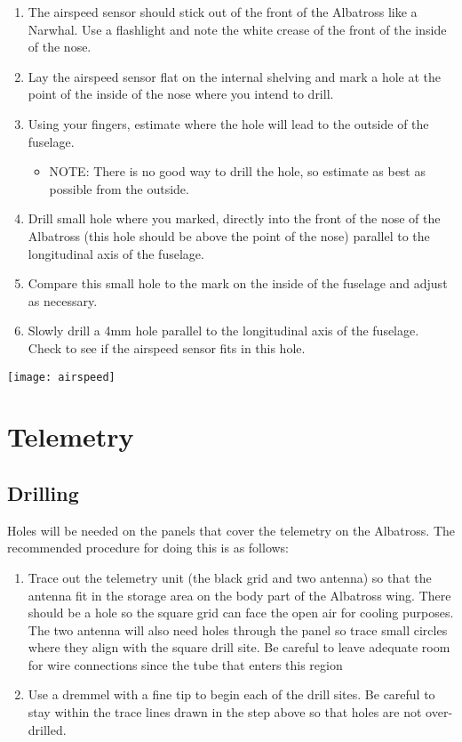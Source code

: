 \documentclass{article}
\begin{document}
\begin{enumerate}
\item The airspeed sensor should stick out of the front of the Albatross like a Narwhal. Use a flashlight and note the white crease of the front of the inside of the nose.
\item Lay the airspeed sensor flat on the internal shelving and mark a hole at the point of the inside of the nose where you intend to drill.
\item Using your fingers, estimate where the hole will lead to the outside of the fuselage. 
   \begin{itemize}
   \item NOTE: There is no good way to drill the hole, so estimate as best as possible from the outside.
   \end{itemize}
\item Drill small hole where you marked, directly into the front of the nose of the Albatross (this hole should be above the point of the nose) parallel to the longitudinal axis of the fuselage. 
\item Compare this small hole to the mark on the inside of the fuselage and adjust as necessary. 
\item Slowly drill a 4mm hole parallel to the longitudinal axis of the fuselage. Check to see if the airspeed sensor fits in this hole. 
\end{enumerate}

\begin{center}
\texttt{[image: airspeed]}
\end{center}

\clearpage


\section{Telemetry}

\subsection{Drilling}
Holes will be needed on the panels that cover the telemetry on the Albatross. The recommended procedure for doing this is as follows:
\begin{enumerate}
\item Trace out the telemetry unit (the black grid and two antenna) so that the antenna fit in the storage area on the body part of the Albatross wing. There should be a hole so the square grid can face the open air for cooling purposes. The two antenna will also need holes through the panel so trace small circles where they align with the square drill site. Be careful to leave adequate room for wire connections since the tube that enters this region 
\item Use a dremmel with a fine tip to begin each of the drill sites. Be careful to stay within the trace lines drawn in the step above so that holes are not over-drilled. 
\end{enumerate}
\clearpage
\end{document}
